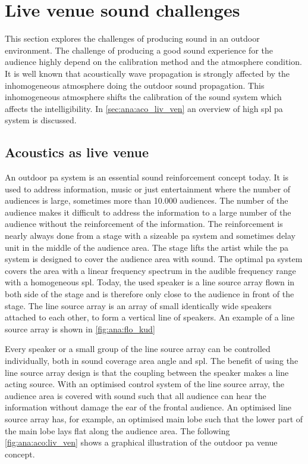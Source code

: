\section{Live venue sound challenges}
This section explores the challenges of producing sound in an outdoor environment. The challenge of producing a good sound experience for the audience highly depend on the calibration method and the atmosphere condition. It is well known that acoustically wave propagation is strongly affected by the inhomogeneous atmosphere doing the outdoor sound propagation. This inhomogeneous atmosphere shifts the calibration of the sound system which affects the intelligibility. In \autoref{sec:ana:aco_liv_ven} an overview of high \gls{spl} \gls{pa} system is discussed.



\subsection{Acoustics as live venue}\label{sec:ana:aco_liv_ven}
An outdoor \gls{pa} system is an essential sound reinforcement concept today. It is used to address information, music or just entertainment where the number of audiences is large, sometimes more than 10.000 audiences. The number of the audience makes it difficult to address the information to a large number of the audience without the reinforcement of the information. The reinforcement is nearly always done from a stage with a sizeable \gls{pa} system and sometimes delay unit in the middle of the audience area. The stage lifts the artist while the \gls{pa} system is designed to cover the audience area with sound. The optimal \gls{pa} system covers the area with a linear frequency spectrum in the audible frequency range with a homogeneous \gls{spl}. Today, the used speaker is a line source array flown in both side of the stage and is therefore only close to the audience in front of the stage. The line source array is an array of small identically wide speakers attached to each other, to form a vertical line of speakers. An example of a line source array is shown in \autoref{fig:ana:flo_kud}


Every speaker or a small group of the line source array can be controlled individually, both in sound coverage area angle and \gls{spl}. The benefit of using the line source array design is that the coupling between the speaker makes a line acting source. With an optimised control system of the line source array, the audience area is covered with sound such that all audience can hear the information without damage the ear of the frontal audience. An optimised line source array has, for example, an optimised main lobe such that the lower part of the main lobe lays flat along the audience area.
The following \autoref{fig:ana:aco:liv_ven} shows a graphical illustration of the outdoor \gls{pa} venue concept.

